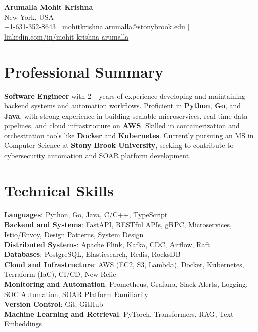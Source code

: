\documentclass[letterpaper,11pt]{article}
\begin{document}
\begin{center}
  {\Large \textbf{Arumalla Mohit Krishna}} \\
  New York, USA \\
  +1-631-352-8643 \enspace | \enspace mohitkrishna.arumalla@stonybrook.edu \enspace | \enspace \href{https://www.linkedin.com/in/mohit-krishna-arumalla}{linkedin.com/in/mohit-krishna-arumalla}
\end{center}

\section{Professional Summary}
  \begin{itemize}[leftmargin=0.15in, label={}]
    \small{\item{
     \textbf{Software Engineer} with 2+ years of experience developing and maintaining backend systems and automation workflows. Proficient in \textbf{Python}, \textbf{Go}, and \textbf{Java}, with strong experience in building scalable microservices, real-time data pipelines, and cloud infrastructure on \textbf{AWS}. Skilled in containerization and orchestration tools like \textbf{Docker} and \textbf{Kubernetes}. Currently pursuing an MS in Computer Science at \textbf{Stony Brook University}, seeking to contribute to cybersecurity automation and SOAR platform development.
    }}
  \end{itemize}
\vspace{-16pt}

\section{Technical Skills}
 \begin{itemize}[leftmargin=0.15in, label={}]
    \small{\item{
     \textbf{Languages}: Python, Go, Java, C/C++, TypeScript \\
     \textbf{Backend and Systems}: FastAPI, RESTful APIs, gRPC, Microservices, Istio/Envoy, Design Patterns, System Design \\
     \textbf{Distributed Systems}: Apache Flink, Kafka, CDC, Airflow, Raft \\
     \textbf{Databases}: PostgreSQL, Elasticsearch, Redis, RocksDB \\
     \textbf{Cloud and Infrastructure}: AWS (EC2, S3, Lambda), Docker, Kubernetes, Terraform (IaC), CI/CD, New Relic \\
     \textbf{Monitoring and Automation}: Prometheus, Grafana, Slack Alerts, Logging, SOC Automation, SOAR Platform Familiarity \\
     \textbf{Version Control}: Git, GitHub \\
     \textbf{Machine Learning and Retrieval}: PyTorch, Transformers, RAG, Text Embeddings
    }}
 \end{itemize}
\vspace{-16pt}
\end{document}
